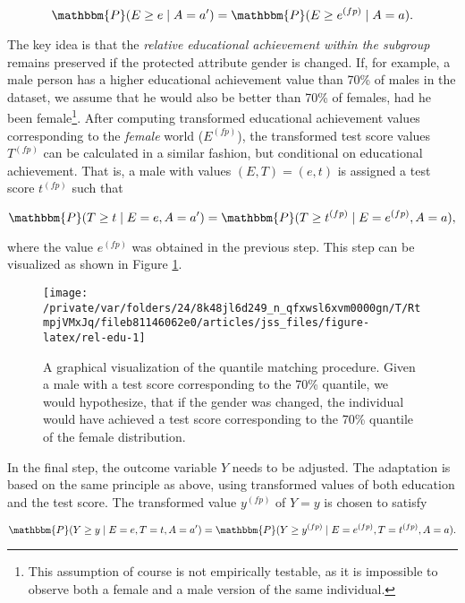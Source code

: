 \documentclass[
  nojss]{jss}
\begin{document}
\[\mathbbm{P}(E \geq e \mid A = a') = \mathbbm{P}(E \geq  {e}^{(fp)} \mid A = a).\]

The key idea is that the \emph{relative educational achievement within
the subgroup} remains preserved if the protected attribute gender is
changed. If, for example, a male person has a higher educational
achievement value than 70\% of males in the dataset, we assume that he
would also be better than 70\% of females, had he been female\footnote{This
  assumption of course is not empirically testable, as it is impossible
  to observe both a female and a male version of the same individual.}.
After computing transformed educational achievement values corresponding
to the \emph{female} world (\( {E}^{(fp)}\)), the transformed test score
values \( {T}^{(fp)}\) can be calculated in a similar fashion, but
conditional on educational achievement. That is, a male with values
\((E, T) = (e, t)\) is assigned a test score \( {t}^{(fp)}\) such that

\[\mathbbm{P}(T \geq t \mid E = e, A = a') = \mathbbm{P}(T \geq  {t}^{(fp)} \mid E =  {e}^{(fp)}, A = a),\]

where the value \( {e}^{(fp)}\) was obtained in the previous step. This
step can be visualized as shown in Figure \ref{fig:rel-edu}.

\begin{CodeChunk}
\begin{figure}

{\centering \texttt{[image: /private/var/folders/24/8k48jl6d249\_n\_qfxwsl6xvm0000gn/T/RtmpjVMxJq/fileb81146062e0/articles/jss\_files/figure-latex/rel-edu-1]} 

}

\caption[A graphical visualization of the quantile matching procedure]{A graphical visualization of the quantile matching procedure. Given a male with a test score corresponding to the 70\% quantile, we would hypothesize, that if the gender was changed, the individual would have achieved a test score corresponding to the 70\% quantile of the female distribution.}\label{fig:rel-edu}
\end{figure}
\end{CodeChunk}

In the final step, the outcome variable \(Y\) needs to be adjusted. The
adaptation is based on the same principle as above, using transformed
values of both education and the test score. The transformed value
\( {y}^{(fp)}\) of \(Y = y\) is chosen to satisfy

\[\mathbbm{P}(Y \geq y \mid E = e, T = t, A = a') = \mathbbm{P}(Y \geq  {y}^{(fp)} \mid E =  {e}^{(fp)}, T =  {t}^{(fp)}, A = a).\]
\end{document}
